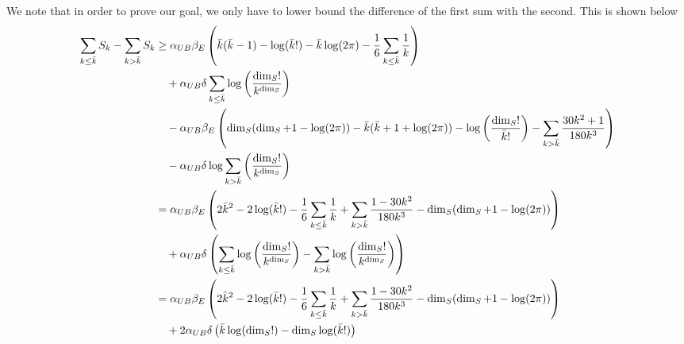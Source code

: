 \documentclass{article}
\newcommand{\parens}[1]{\left( #1 \right)}
\begin{document}
We note that in order to prove our goal, we only have to lower bound the difference of the first sum with the second. This is shown below
\begin{align}
    \sum_{k \leq \Bar{k}} S_k - \sum_{k > \Bar{k}} S_k &\geq \alpha_{UB} \beta_E \parens{\Bar{k} (\Bar{k} - 1) -\log (\Bar{k}!) - \Bar{k} \log(2 \pi) - \frac{1}{6} \sum_{k \leq \Bar{k}} \frac{1}{k}} \nonumber \\
    &\quad + \alpha_{UB} \delta \sum_{k \leq \Bar{k}} \log \parens{\frac{\dim_S!}{k^{\dim_S}}} \nonumber \\
    &\quad - \alpha_{UB} \beta_E \parens{ \dim_S (\dim_S + 1 - \log(2 \pi)) - \Bar{k} (\Bar{k} +1 + \log(2 \pi)) - \log \parens{\frac{\dim_S!  }{\Bar{k}!}} - \sum_{k > \Bar{k}} \frac{30 k^2 + 1}{180 k^3}} \nonumber \\
    &\quad - \alpha_{UB} \delta \log \sum_{k > \Bar{k}} \parens{\frac{\dim_S!}{k^{\dim_S}}} \\
    &= \alpha_{UB} \beta_E \parens{2 \Bar{k}^2 - 2 \log (\Bar{k}!) - \frac{1}{6} \sum_{k \leq \Bar{k}} \frac{1}{k} + \sum_{k > \Bar{k}} \frac{1 - 30 k^2}{180 k^3} - \dim_S (\dim_S + 1 - \log (2 \pi) )} \nonumber \\
    &\quad + \alpha_{UB} \delta \parens{\sum_{k \leq \Bar{k}} \log \parens{\frac{\dim_S!}{k^{\dim_S}}} -  \sum_{k > \Bar{k}} \log \parens{\frac{\dim_S!}{k^{\dim_S}}}} \\
    &= \alpha_{UB} \beta_E \parens{2 \Bar{k}^2 - 2 \log (\Bar{k}!) - \frac{1}{6} \sum_{k \leq \Bar{k}} \frac{1}{k} + \sum_{k > \Bar{k}} \frac{1 - 30 k^2}{180 k^3} - \dim_S (\dim_S + 1 - \log (2 \pi) )} \nonumber \\
    &\quad + 2 \alpha_{UB} \delta \parens{\Bar{k} \log(\dim_S!) - \dim_S \log(\Bar{k}!)}  \\
\end{align}

\newpage
\end{document}
